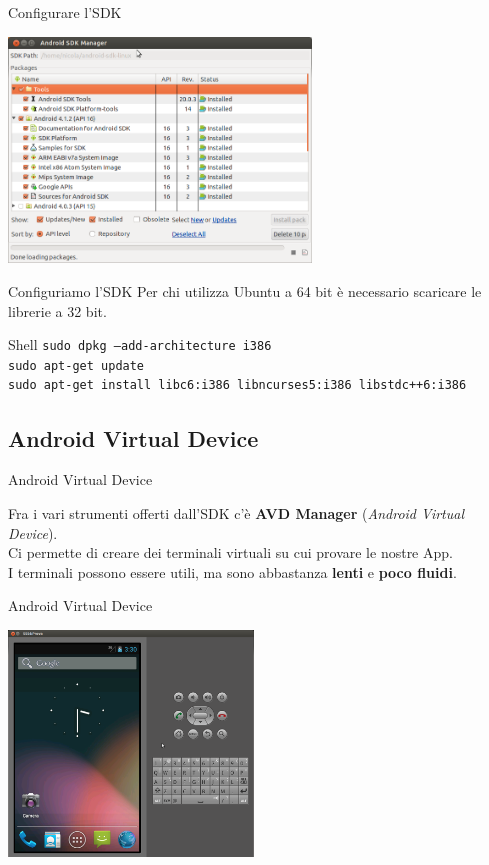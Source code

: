 \documentclass[xcolor=svgnames,11pt]{beamer}
\begin{document}
\begin{frame}{Configurare l'SDK}
\begin{center}
\includegraphics[height=6cm]{manage.png}
\end{center}
\end{frame}

\begin{frame}{Configuriamo l'SDK}
Per chi utilizza Ubuntu a 64 bit \`e necessario scaricare le librerie a 32 bit.
\pause
\medskip
\begin{block}{Shell}
\texttt{sudo dpkg --add-architecture i386}\\
\texttt{sudo apt-get update}\\
\texttt{sudo apt-get install libc6:i386 libncurses5:i386 libstdc++6:i386}
\end{block}
\end{frame}

\subsection{Android Virtual Device}
\begin{frame}{Android Virtual Device}

	Fra i vari strumenti offerti dall'SDK c'\`e \textbf{AVD Manager} (\emph{Android Virtual Device}).\\
	\pause
	\medskip
	Ci permette di creare dei terminali virtuali su cui provare le nostre App.\\
	\pause
	\medskip
	I terminali possono essere utili, ma sono abbastanza \textbf{lenti} e \textbf{poco fluidi}.

\end{frame}
\begin{frame}{Android Virtual Device}

\begin{center}
\includegraphics[height=6cm]{avd.png}
\end{center}
\end{frame}
\end{document}
